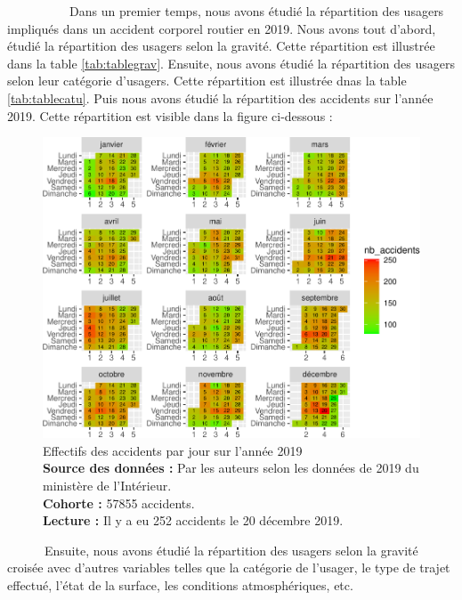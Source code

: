 \documentclass[french,]{tp}
\begin{document}
~~~~~~~~~~Dans un premier temps, nous avons étudié la répartition des usagers impliqués dans un accident corporel routier en 2019. Nous avons tout d'abord, étudié la répartition des usagers selon la gravité. Cette répartition est illustrée dans la table \ref{tab:tablegrav}. Ensuite, nous avons étudié la répartition des usagers selon leur catégorie d'usagers. Cette répartition est illustrée dnas la table \ref{tab:tablecatu}. Puis nous avons étudié la répartition des accidents sur l'année 2019. Cette répartition est visible dans la figure ci-dessous :






\begin{figure}[ht!]

{\centering \includegraphics{Prediction_Gravite_files/figure-latex/calendrier-1} 

}

\caption{Effectifs des accidents par jour sur l'année 2019\\
\textbf{Source des données :} Par les auteurs selon les données de 2019 du ministère de l'Intérieur.\\
\textbf{Cohorte :} 57855 accidents.\\
\textbf{Lecture :} Il y a eu 252 accidents le 20 décembre 2019.}\label{fig:calendrier}
\end{figure}

~~~~~~Ensuite, nous avons étudié la répartition des usagers selon la gravité croisée avec d'autres variables telles que la catégorie de l'usager, le type de trajet effectué, l'état de la surface, les conditions atmosphériques, etc.
\end{document}
